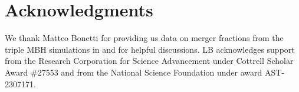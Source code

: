 \documentclass[twocolumn,linenumbers]{aastex701}
\begin{document}
\section{Acknowledgments}
We thank Matteo Bonetti for providing us data on merger fractions from the triple MBH simulations in \citet{bonetti_post-newtonian_2018-1} and for helpful discussions. LB acknowledges support from the Research Corporation for Science Advancement under Cottrell Scholar Award \#27553 and from the National Science Foundation under award AST-2307171.


{}

\end{document}
